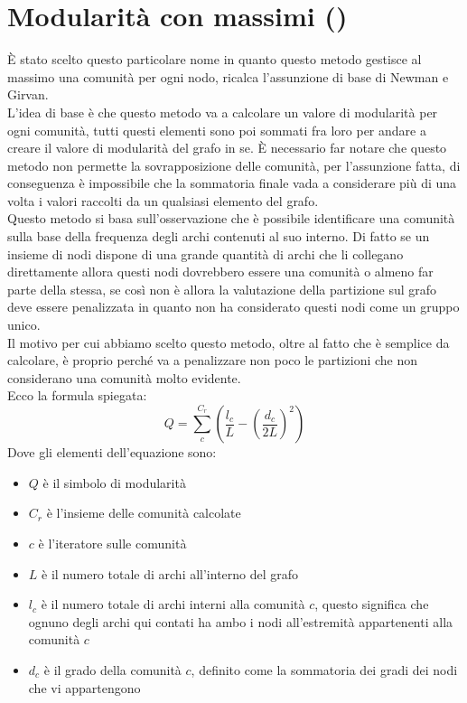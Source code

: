 \section{Modularità con massimi (\mmax)}
È stato scelto questo particolare nome in quanto questo metodo gestisce al massimo una comunità per ogni nodo, ricalca l'assunzione di base di Newman e Girvan.\\
L'idea di base è che questo metodo va a calcolare un valore di modularità per ogni comunità, tutti questi elementi sono poi sommati fra loro per andare a creare il valore di modularità del grafo in se. È necessario far notare che questo metodo non permette la sovrapposizione delle comunità, per l'assunzione fatta, di conseguenza è impossibile che la sommatoria finale vada a considerare più di una volta i valori raccolti da un qualsiasi elemento del grafo.\\
Questo metodo si basa sull'osservazione che è possibile identificare una comunità sulla base della frequenza degli archi contenuti al suo interno. Di fatto se un insieme di nodi dispone di una grande quantità di archi che li collegano direttamente allora questi nodi dovrebbero essere una comunità o almeno far parte della stessa, se così non è allora la valutazione della partizione sul grafo deve essere penalizzata in quanto non ha considerato questi nodi come un gruppo unico.\\
Il motivo per cui abbiamo scelto questo metodo, oltre al fatto che è semplice da calcolare, è proprio perché va a penalizzare non poco le partizioni che non considerano una comunità molto evidente.\\
Ecco la formula spiegata:
\begin{equation}
	Q=\sum_{c}^{C_r} \left( \frac{l_c}{L}-\left(\frac{d_c}{2L} \right)^2 \right)
	\label{eq:m_max}
\end{equation}
Dove gli elementi dell'equazione sono:
\begin{itemize}
	\item $Q$ è il simbolo di modularità
	\item $C_r$ è l'insieme delle comunità calcolate
	\item $c$ è l'iteratore sulle comunità
	\item $L$ è il numero totale di archi all'interno del grafo
	\item $l_c$ è il numero totale di archi interni alla comunità $c$, questo significa che ognuno degli archi qui contati ha ambo i nodi all'estremità appartenenti alla comunità $c$
	\item $d_c$ è il grado della comunità $c$, definito come la sommatoria dei gradi dei nodi che vi appartengono
\end{itemize}

